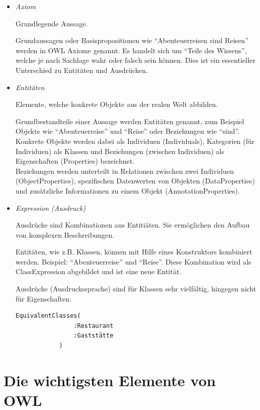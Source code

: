 \begin{itemize}
	\item \textit{Axiom}

        Grundlegende Aussage.

        Grundaussagen  oder Basispropositionen wie ``Abenteuerreisen sind Reisen'' werden in OWL Axiome genannt. Es handelt sich  um ``Teile des Wissens'', welche je nach Sachlage wahr oder falsch sein können. Dies ist ein essentieller Unterschied zu Entitäten und Ausdrücken.

    \item \textit{Entitäten}

        Elemente, welche konkrete Objekte aus der realen Welt abbilden.

        Grundbestandteile einer Aussage werden Entitäten genannt, zum Beispiel Objekte wie ``Abenteuerreise'' und ``Reise'' oder Beziehungen wie ``sind''.\\
        Konkrete Objekte werden dabei als Individuen (Individuals), Kategorien (für Individuen) als Klassen und Beziehungen (zwischen Individuen) als Eigenschaften (Properties) bezeichnet.\\
        Beziehungen werden unterteilt in Relationen zwischen zwei Individuen (ObjectProperties), spezifischen Datenwerten von Objekten (DataProperties) und zusätzliche Informationen zu einem Objekt (AnnotationProperties).

	\item \textit{Expression (Ausdruck)}

        Ausdrücke sind Kombinationen aus Entitiäten. Sie ermöglichen den Aufbau von komplexen Beschreibungen.

        Entitäten, wie z.B. Klassen, können mit Hilfe eines Konstruktors kombiniert werden. Beispiel: ``Abenteuerreise'' und ``Reise''. Diese Kombination wird als ClassExpression abgebildet und ist eine neue Entität.

        Ausdrücke (Ausdruckssprache) sind für Klassen sehr vielfältig, hingegen nicht für Eigenschaften.

        \begin{lstlisting}[caption={Beispiel eines Ausdrucks: Zwei Klassen bedeuten das Gleiche}]
            EquivalentClasses(
                :Restaurant
                :Gaststätte
            )
        \end{lstlisting}

\end{itemize}


\section{Die wichtigsten Elemente von OWL}
\label{sec:owlRdf_owl_wichtigsteElemente}

